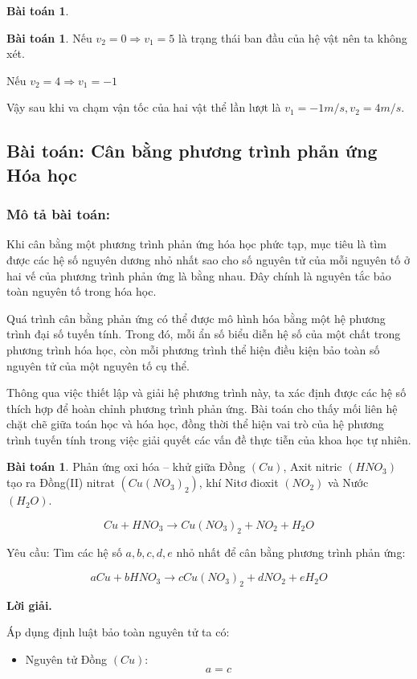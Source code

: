 \documentclass[12pt,a4paper,oneside]{book}
\theoremstyle{theorem}
\theoremstyle{definition}
\newtheorem{bt}[theorem2]{Bài toán}
\begin{document}
\begin{bt}
\begin{bt}
Nếu $v_2=0\Rightarrow v_1=5$ là trạng thái ban đầu của hệ vật nên ta không xét.

Nếu $v_2=4\Rightarrow v_1=-1$

Vậy sau khi va chạm vận tốc của hai vật thể lần lượt là $v_1=-1m/s,v_2=4m/s$.
\end{bt}
 
  \subsection{Bài toán: Cân bằng phương trình phản ứng Hóa học}
  
\subsubsection{Mô tả bài toán:} Khi cân bằng một phương trình phản ứng hóa học phức tạp, mục tiêu là tìm
được các hệ số nguyên dương nhỏ nhất sao cho số nguyên tử của mỗi nguyên tố
ở hai vế của phương trình phản ứng là bằng nhau. Đây chính là nguyên tắc bảo
toàn nguyên tố trong hóa học.

Quá trình cân bằng phản ứng có thể được mô hình hóa bằng một hệ phương
trình đại số tuyến tính. Trong đó, mỗi ẩn số biểu diễn hệ số của một chất trong
phương trình hóa học, còn mỗi phương trình thể hiện điều kiện bảo toàn số
nguyên tử của một nguyên tố cụ thể.

Thông qua việc thiết lập và giải hệ phương trình này, ta xác định được các hệ
số thích hợp để hoàn chỉnh phương trình phản ứng. Bài toán cho thấy mối liên
hệ chặt chẽ giữa toán học và hóa học, đồng thời thể hiện vai trò của hệ phương
trình tuyến tính trong việc giải quyết các vấn đề thực tiễn của khoa học tự nhiên.

\begin{bt}
 Phản ứng oxi hóa -- khử giữa Đồng \((Cu)\), Axit nitric
\((HNO_3)\) tạo ra Đồng(II) nitrat \((Cu(NO_3)_2)\), khí Nitơ đioxit
\((NO_2)\) và Nước \((H_2O)\).

\[
Cu+HNO_3\rightarrow Cu(NO_3)_2+NO_2+H_2O
\]

Yêu cầu: Tìm các hệ số \(a,b,c,d,e\) nhỏ nhất để cân bằng phương trình phản ứng:

\[
aCu+bHNO_3\rightarrow cCu(NO_3)_2+dNO_2+eH_2O
\]

\bigskip

\textbf{Lời giải.}

\medskip

Áp dụng định luật bảo toàn nguyên tử ta có:

\begin{itemize}
    \item Nguyên tử Đồng \((Cu)\):
    \[
    a=c
    \]


\end{itemize}
\end{bt}
\end{bt}
\end{document}
